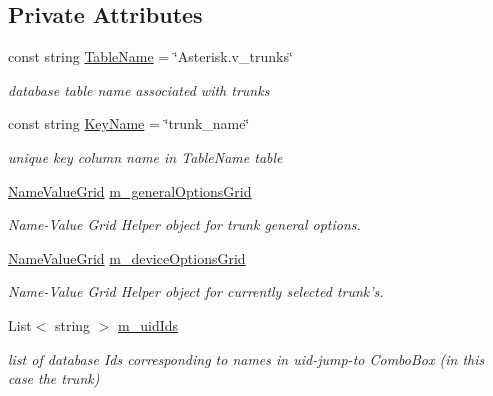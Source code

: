 \subsection*{Private Attributes}
\begin{DoxyCompactItemize}
\item 
const string \hyperlink{class_ias_pbx_config_1_1_trunk_details_aa073b291eda0041622361db624283b0b}{TableName} = \char`\"{}Asterisk.v\_\-trunks\char`\"{}
\begin{DoxyCompactList}\small\item\em database table name associated with trunks \item\end{DoxyCompactList}\item 
const string \hyperlink{class_ias_pbx_config_1_1_trunk_details_a33a6ccc4c818a4c5c3dfffd05ea0fbf4}{KeyName} = \char`\"{}trunk\_\-name\char`\"{}
\begin{DoxyCompactList}\small\item\em unique key column name in TableName table \item\end{DoxyCompactList}\item 
\hyperlink{class_ias_pbx_config_1_1_name_value_grid}{NameValueGrid} \hyperlink{class_ias_pbx_config_1_1_trunk_details_a6cf2a5bbc63dabcbd0e688dff152ae49}{m\_\-generalOptionsGrid}
\begin{DoxyCompactList}\small\item\em Name-\/Value Grid Helper object for trunk general options. \item\end{DoxyCompactList}\item 
\hyperlink{class_ias_pbx_config_1_1_name_value_grid}{NameValueGrid} \hyperlink{class_ias_pbx_config_1_1_trunk_details_a23327d72e0f1d36e063e9e6250956314}{m\_\-deviceOptionsGrid}
\begin{DoxyCompactList}\small\item\em Name-\/Value Grid Helper object for currently selected trunk's. \item\end{DoxyCompactList}\item 
List$<$ string $>$ \hyperlink{class_ias_pbx_config_1_1_trunk_details_a6d2b111c9d9cbbbe435830d0ec4d2f32}{m\_\-uidIds}
\begin{DoxyCompactList}\small\item\em list of database Ids corresponding to names in uid-\/jump-\/to ComboBox (in this case the trunk) \item\end{DoxyCompactList}\item 

\end{DoxyCompactItemize}
